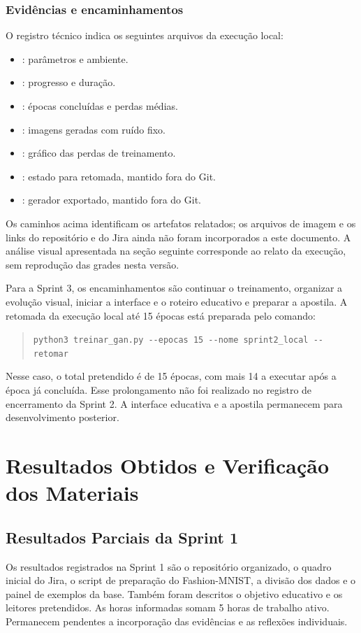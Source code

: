 \documentclass[12pt,a4paper]{article}
\begin{document}
\subsubsection{Evidências e encaminhamentos}
O registro técnico indica os seguintes arquivos da execução local:
\begin{itemize}
\item {}: parâmetros e ambiente.
\item {}: progresso e duração.
\item {}: épocas concluídas e perdas médias.
\item {}: imagens geradas com ruído fixo.
\item {}: gráfico das perdas de treinamento.
\item {}: estado para retomada, mantido fora do Git.
\item {}: gerador exportado, mantido fora do Git.
\end{itemize}

Os caminhos acima identificam os artefatos relatados; os arquivos de imagem e os links do repositório e do Jira ainda não foram incorporados a este documento. A análise visual apresentada na seção seguinte corresponde ao relato da execução, sem reprodução das grades nesta versão.

Para a Sprint 3, os encaminhamentos são continuar o treinamento, organizar a evolução visual, iniciar a interface e o roteiro educativo e preparar a apostila. A retomada da execução local até 15 épocas está preparada pelo comando:
\begin{quote}
\small\verb|python3 treinar_gan.py --epocas 15 --nome sprint2_local --retomar|
\end{quote}
Nesse caso, o total pretendido é de 15 épocas, com mais 14 a executar após a época já concluída. Esse prolongamento não foi realizado no registro de encerramento da Sprint 2. A interface educativa e a apostila permanecem para desenvolvimento posterior.

\section{Resultados Obtidos e Verificação dos Materiais}
\subsection{Resultados Parciais da Sprint 1}
Os resultados registrados na Sprint 1 são o repositório organizado, o quadro inicial do Jira, o script de preparação do Fashion-MNIST, a divisão dos dados e o painel de exemplos da base. Também foram descritos o objetivo educativo e os leitores pretendidos. As horas informadas somam 5 horas de trabalho ativo. Permanecem pendentes a incorporação das evidências e as reflexões individuais.
\end{document}
